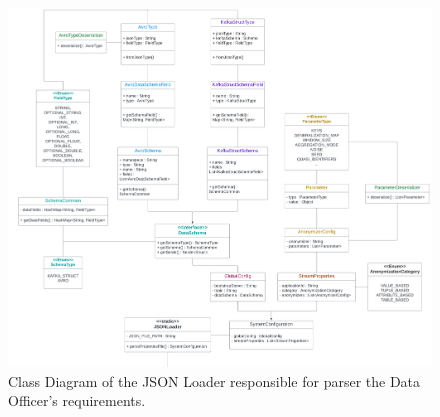 \begin{figure}[H]
   \begin{adjustbox}{center}
   \includegraphics[width=0.85\pdfpagewidth]{img/Requirements_Parser_Class_Diagram.pdf}
   \end{adjustbox}
   \caption{Class Diagram of the JSON Loader responsible for parser the Data Officer's requirements.\label{fig:requirements_parser}}
\end{figure}

